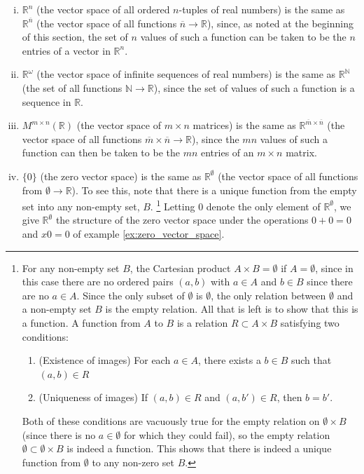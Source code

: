 \documentclass[12pt,letterpaper,reqno]{article}
\numberwithin{equation}{section}
\begin{document}
\begin{enumerate}[(i)]
	\item $\mathbb{R}^n$ (the vector space of all ordered $n$-tuples of real numbers) is the same as $\mathbb{R}^{\overline{n}}$ (the vector space of all functions $\overline{n} \to \mathbb{R}$), since, as noted at the beginning of this section, the set of $n$ values of such a function can be taken to be the $n$ entries of a vector in $\mathbb{R}^n$.
	\item $\mathbb{R}^\omega$ (the vector space of infinite sequences of real numbers) is the same as $\mathbb{R}^{\mathbb{N}}$ (the set of all functions $\mathbb{N} \to \mathbb{R}$), since the set of values of such a function is a sequence in $\mathbb{R}$.
	\item $M^{m \times n}(\mathbb{R})$ (the vector space of $m \times n$ matrices) is the same as $\mathbb{R}^{\overline{m} \times \overline{n}}$ (the vector space of all functions $\overline{m} \times \overline{n} \to \mathbb{R}$), since the $mn$ values of such a function can then be taken to be the $mn$ entries of an $m \times n$ matrix.
	\item $\{0\}$ (the zero vector space) is the same as $\mathbb{R}^\emptyset$ (the vector space of all functions from $\emptyset \to \mathbb{R}$). To see this, note that there is a unique function from the empty set into any non-empty set, $B$.  \footnote{For any non-empty set $B$, the Cartesian product $A \times B=\emptyset$ if $A=\emptyset$, since in this case there are no ordered pairs $(a,b)$ with $a \in A$ and $b \in B$ since there are no $a \in A$. Since the only subset of $\emptyset$ is $\emptyset$, the only relation between $\emptyset$ and a non-empty set $B$ is the empty relation. All that is left is to show that this is a function. A function from $A$ to $B$ is a relation $R \subset A \times B$ satisfying two conditions:
\begin{enumerate}[(1)]
	\item (Existence of images) For each $a \in A$, there exists a $b \in B$ such that $(a,b) \in R$
	\item (Uniqueness of images) If $(a,b) \in R$ and $(a,b') \in R$, then $b=b'$. 
\end{enumerate}
Both of these conditions are vacuously true for the empty relation on $\emptyset \times B$ (since there is no $a \in \emptyset$ for which they could fail), so the empty relation $\emptyset \subset \emptyset \times B$ is indeed a function. This shows that there is indeed a unique function from $\emptyset$ to any non-zero set $B$.} Letting $0$ denote the only element of $\mathbb{R}^{\emptyset}$, we give $\mathbb{R}^{\emptyset}$ the structure of the zero vector space under the operations $0+0=0$ and $x0=0$ of example \ref{ex:zero_vector_space}. 
\end{enumerate}
\end{document}

